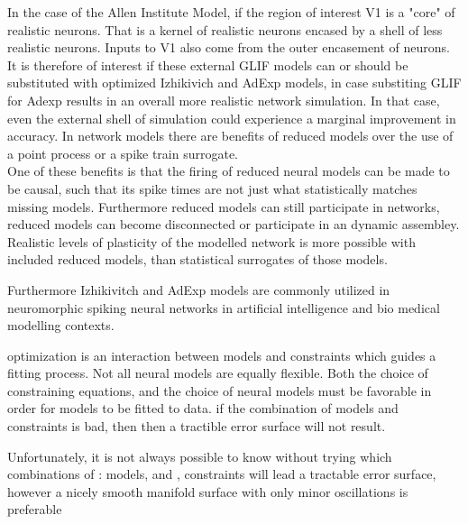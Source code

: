 
In the case of the Allen Institute Model, if the region of interest V1 is a "core" of realistic neurons. That is a kernel of realistic neurons encased by a shell of less realistic neurons. Inputs to V1 also come from the outer encasement of neurons. It is therefore of interest if these external GLIF models can or should be substituted with optimized Izhikivich and AdExp models, in case substiting GLIF for Adexp results in an overall more realistic network simulation. In that case, even the external shell of simulation could experience a marginal improvement in accuracy. In network models there are benefits of reduced models over the use of a point process or a spike train surrogate.\\


One of these benefits is that the firing of reduced neural models can be made to be causal, such that its spike times are not just what statistically matches missing models. Furthermore reduced models can still participate in networks, reduced models can become disconnected or participate in an dynamic assembley. Realistic levels of plasticity of the modelled network is more possible with included reduced models, than statistical surrogates of those models.

Furthermore Izhikivitch and AdExp models are commonly utilized in neuromorphic spiking neural networks in artificial intelligence and bio medical modelling contexts.

optimization is an interaction between models and constraints which guides a fitting process. Not all neural models are equally flexible.  
Both the choice of constraining equations, and the choice of neural models must be favorable in order for models to be fitted to data.
if the combination of models and constraints is bad, then then a tractible error surface will not result.  

Unfortunately, it is not always possible to know without trying which combinations of \subitem[A]: models, and \subitem[B], constraints will lead a tractable error surface, however a nicely smooth manifold surface with only minor oscillations is preferable

